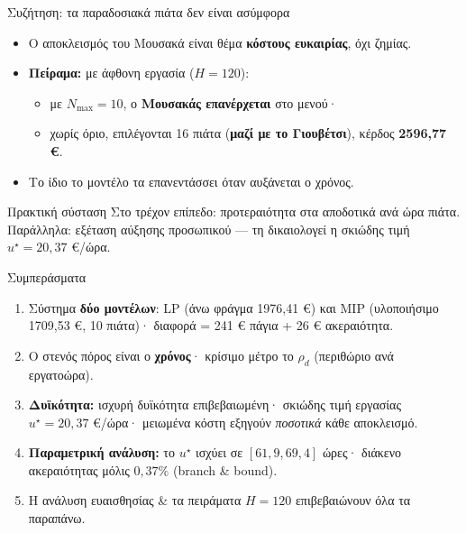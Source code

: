 \documentclass[aspectratio=169,11pt]{beamer}
\newcommand{\en}[1]{\textenglish{#1}}
\begin{document}
\begin{frame}{Συζήτηση: τα παραδοσιακά πιάτα δεν είναι ασύμφορα}
  \begin{itemize}
    \item Ο αποκλεισμός του Μουσακά είναι θέμα \textbf{κόστους ευκαιρίας}, όχι ζημίας.
    \item \textbf{Πείραμα:} με άφθονη εργασία ($H=120$):
      \begin{itemize}
        \item με $N_{\max}=10$, ο \textbf{Μουσακάς επανέρχεται} στο μενού·
        \item χωρίς όριο, επιλέγονται 16 πιάτα (\textbf{μαζί με το Γιουβέτσι}),
          κέρδος \textbf{2596,77 €}.
      \end{itemize}
    \item Το ίδιο το μοντέλο τα επανεντάσσει όταν αυξάνεται ο χρόνος.
  \end{itemize}
  \vfill
  \begin{block}{Πρακτική σύσταση}
    Στο τρέχον επίπεδο: προτεραιότητα στα αποδοτικά ανά ώρα πιάτα. Παράλληλα:
    εξέταση αύξησης προσωπικού --- τη δικαιολογεί η σκιώδης τιμή $u^\star=20{,}37$ €/ώρα.
  \end{block}
\end{frame}

\begin{frame}{Συμπεράσματα}
  \begin{enumerate}
    \item Σύστημα \textbf{δύο μοντέλων}: \en{LP} (άνω φράγμα 1976,41 €) και \en{MIP}
      (υλοποιήσιμο 1709,53 €, 10 πιάτα)· διαφορά = 241 € πάγια + 26 € ακεραιότητα.
    \item Ο στενός πόρος είναι ο \textbf{χρόνος}· κρίσιμο μέτρο το $\rho_d$
      (περιθώριο ανά εργατοώρα).
    \item \textbf{Δυϊκότητα:} ισχυρή δυϊκότητα επιβεβαιωμένη· σκιώδης τιμή εργασίας
      $u^\star=20{,}37$ €/ώρα· μειωμένα κόστη εξηγούν \emph{ποσοτικά} κάθε αποκλεισμό.
    \item \textbf{Παραμετρική ανάλυση:} το $u^\star$ ισχύει σε $[61{,}9, 69{,}4]$ ώρες·
      διάκενο ακεραιότητας μόλις $0{,}37\%$ (\en{branch \& bound}).
    \item Η ανάλυση ευαισθησίας \& τα πειράματα $H=120$ επιβεβαιώνουν όλα τα παραπάνω.
  \end{enumerate}
  \vfill
  \centering
\end{frame}
\end{document}
